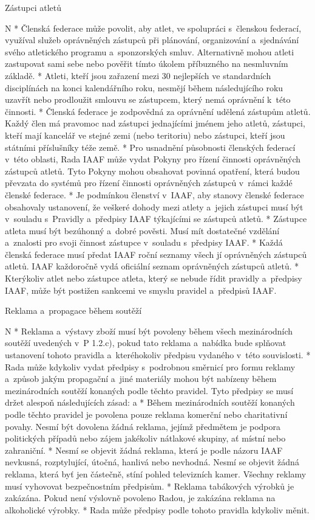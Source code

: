 \secc Zástupci atletů

\begitems \style N
* Členská federace může povolit, aby atlet, ve spolupráci s~členskou federací, využíval služeb oprávněných zástupců při plánování, organizování a~sjednávání svého atletického programu a~sponzorských smluv. Alternativně mohou atleti zastupovat sami sebe nebo pověřit tímto úkolem příbuzného na nesmluvním základě.
* Atleti, kteří jsou zařazení mezi 30 nejlepších ve standardních disciplínách na konci kalendářního roku, nesmějí během následujícího roku uzavřít nebo prodloužit smlouvu se zástupcem, který nemá oprávnění k~této činnosti.
* Členská federace je zodpovědná za oprávnění udělená zástupům atletů. Každý člen má pravomoc nad zástupci jednajícími jménem jeho atletů, zástupci, kteří mají kancelář ve stejné zemi (nebo teritoriu) nebo zástupci, kteří jsou státními příslušníky téže země.
* Pro usnadnění působnosti členských federací v~této oblasti, Rada IAAF může vydat Pokyny pro řízení činnosti oprávněných zástupců atletů. Tyto Pokyny mohou obsahovat povinná opatření, která budou převzata do systémů pro řízení činnosti oprávněných zástupců v~rámci každé členské federace.
* Je podmínkou členství v~IAAF, aby stanovy členské federace obsahovaly ustanovení, že veškeré dohody mezi atlety a~jejich zástupci musí být v~souladu s~Pravidly a~předpisy IAAF týkajícími se zástupců atletů.
* Zástupce atleta musí být bezúhonný a~dobré pověsti. Musí mít dostatečné vzdělání a~znalosti pro svoji činnost zástupce v~souladu s~předpisy IAAF.
* Každá členská federace musí předat IAAF roční seznamy všech jí oprávněných zástupců atletů. IAAF každoročně vydá oficiální seznam oprávněných zástupců atletů.
* Kterýkoliv atlet nebo zástupce atleta, který se nebude řídit pravidly a~předpisy IAAF, může být postižen sankcemi ve smyslu pravidel a~předpisů IAAF.
\enditems

\secc Reklama a~propagace během soutěží

\begitems \style N
* Reklama a~výstavy zboží musí být povoleny během všech mezinárodních soutěží uvedených v~P 1.2.c), pokud tato reklama a~nabídka bude splňovat ustanovení tohoto pravidla a~kteréhokoliv předpisu vydaného v~této souvislosti.
* Rada může kdykoliv vydat předpisy s~podrobnou směrnicí pro formu reklamy a~způsob jakým propagační a~jiné materiály mohou být nabízeny během mezinárodních soutěží konaných podle těchto pravidel. Tyto předpisy se musí držet alespoň následujících zásad:
  \begitems \style a
  * Během mezinárodních soutěží konaných podle těchto pravidel je povolena pouze reklama komerční nebo charitativní povahy. Nesmí být dovolena žádná reklama, jejímž předmětem je podpora politických případů nebo zájem jakékoliv nátlakové skupiny, ať místní nebo zahraniční.
  * Nesmí se objevit žádná reklama, která je podle názoru IAAF nevkusná, rozptylující, útočná, hanlivá nebo nevhodná. Nesmí se objevit žádná reklama, která byť jen částečně, stíní pohled televizních kamer. Všechny reklamy musí vyhovovat bezpečnostním předpisům.
  * Reklama tabákových výrobků je zakázána. Pokud není výslovně povoleno Radou, je zakázána reklama na alkoholické výrobky.
  \enditems
* Rada může předpisy podle tohoto pravidla kdykoliv měnit.
\enditems

\endinput
